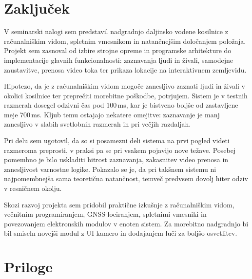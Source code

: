\documentclass[12pt]{article}
\begin{document}
\section{Zaključek}

V seminarski nalogi sem predstavil nadgradnjo daljinsko vodene
kosilnice z računalniškim vidom, spletnim vmesnikom in natančnejšim
določanjem položaja. Projekt sem zasnoval od izbire strojne opreme in
programske arhitekture do implementacije glavnih funkcionalnosti:
zaznavanja ljudi in živali, samodejne zaustavitve, prenosa video toka
ter prikaza lokacije na interaktivnem zemljevidu.

Hipotezo, da je z računalniškim vidom mogoče zanesljivo zaznati
ljudi in živali v okolici kosilnice ter preprečiti morebitne poškodbe,
potrjujem. Sistem je v testnih razmerah dosegel odzivni čas pod
100\,ms, kar je bistveno boljše od zastavljene meje 700\,ms.
Kljub temu ostajajo nekatere omejitve: zaznavanje je manj zanesljivo
v slabih svetlobnih razmerah in pri večjih razdaljah.

Pri delu sem ugotovil, da so si posamezni deli sistema na prvi pogled
videti razmeroma preprosti, v praksi pa se pri vsakem pojavijo nove
težave. Posebej pomembno je bilo uskladiti hitrost zaznavanja,
zakasnitev video prenosa in zanesljivost varnostne logike. Pokazalo
se je, da pri takšnem sistemu ni najpomembnejša sama teoretična
natančnost, temveč predvsem dovolj hiter odziv v
resničnem okolju.

Skozi razvoj projekta sem pridobil praktične izkušnje z računalniškim
vidom, večnitnim programiranjem, GNSS-lociranjem, spletnimi vmesniki
in povezovanjem elektronskih modulov v enoten sistem. Za morebitno
nadgradnjo bi bil smiseln novejši modul z UI kamero in dodajanjem
luči za boljšo osvetlitev.

\newpage
\printbibliography[heading=bibintoc, title={Viri in literatura}]

\appendix
\section{Priloge}
\end{document}
